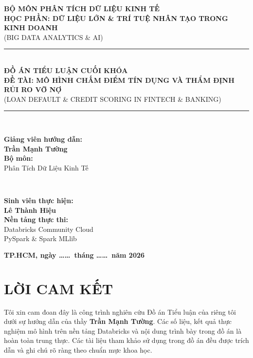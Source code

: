 \begin{titlepage}
    \centering
    \vspace*{0.5cm}
    
    {\Large \textbf{BỘ MÔN PHÂN TÍCH DỮ LIỆU KINH TẾ}}\\[0.3cm]
    {\large \textbf{HỌC PHẦN: DỮ LIỆU LỚN \& TRÍ TUỆ NHÂN TẠO TRONG KINH DOANH}}\\[0.2cm]
    {\small (BIG DATA ANALYTICS \& AI)}\\[1.5cm]
    
    \rule{\linewidth}{0.5mm} \\[0.4cm]
    {\huge \textbf{ĐỒ ÁN TIỂU LUẬN CUỐI KHÓA}}\\[0.4cm]
    {\Large \textbf{ĐỀ TÀI: MÔ HÌNH CHẤM ĐIỂM TÍN DỤNG VÀ THẨM ĐỊNH RỦI RO VỠ NỢ}}\\[0.2cm]
    {\small (LOAN DEFAULT \& CREDIT SCORING IN FINTECH \& BANKING)}\\[0.4cm]
    \rule{\linewidth}{0.5mm} \\[1.8cm]
    
    \begin{minipage}{0.48\textwidth}
        \begin{left} \large
            \textbf{Giảng viên hướng dẫn:}\\
            \textbf{Trần Mạnh Tường}\\[0.5cm]
            \textbf{Bộ môn:}\\
            Phân Tích Dữ Liệu Kinh Tế
        \end{left}
    \end{minipage}
    ~
    \begin{minipage}{0.48\textwidth}
        \begin{right} \large
            \textbf{Sinh viên thực hiện:}\\
            \textbf{Lê Thành Hiệu}\\[0.5cm]
            \textbf{Nền tảng thực thi:}\\
            Databricks Community Cloud\\
            PySpark \& Spark MLlib
        \end{right}
    \end{minipage}
    
    \vfill
    
    {\large \textbf{TP.HCM, ngày \dots\dots\ tháng \dots\dots\ năm 2026}}
\end{titlepage}

\chapter*{LỜI CAM KẾT}
Tôi xin cam đoan đây là công trình nghiên cứu Đồ án Tiểu luận của riêng tôi dưới sự hướng dẫn của thầy \textbf{Trần Mạnh Tường}. Các số liệu, kết quả thực nghiệm mô hình trên nền tảng Databricks và nội dung trình bày trong đồ án là hoàn toàn trung thực. Các tài liệu tham khảo sử dụng trong đồ án đều được trích dẫn và ghi chú rõ ràng theo chuẩn mực khoa học.

